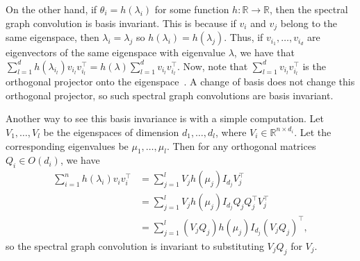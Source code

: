 \documentclass{article} \usepackage{iclr2023_conference,times}
\newcommand{\RR}{\mathbb R}
\begin{document}
On the other hand, if $\theta_i = h(\lambda_i)$ for some function $h: \RR \to \RR$, then the spectral graph convolution is basis invariant. This is because if $v_i$ and $v_j$ belong to the same eigenspace, then $\lambda_i = \lambda_j$ so $h(\lambda_i) = h(\lambda_j)$. Thus, if $v_{i_1}, \ldots, v_{i_d}$ are eigenvectors of the same eigenspace with eigenvalue $\lambda$, we have that $\sum_{l=1}^d h(\lambda_{i_l}) v_{i_l} v_{i_l}^\top = h(\lambda) \sum_{l=1}^d v_{i_l} v_{i_l}^\top$. Now, note that $\sum_{l=1}^d v_{i_l} v_{i_l}^\top$ is the orthogonal projector onto the eigenspace~\citep{trefethen1997numerical}. A change of basis does not change this orthogonal projector, so such spectral graph convolutions are basis invariant.

Another way to see this basis invariance is with a simple computation. Let $V_1, \ldots, V_l$ be the eigenspaces of dimension $d_1, \ldots, d_l$, where $V_i \in \RR^{n \times d_i}$. Let the corresponding eigenvalues be $\mu_1, \ldots, \mu_l$. Then for any orthogonal matrices $Q_i \in O(d_i)$, we have
\begin{align}
    \sum_{i=1}^n h(\lambda_i) v_i v_i^\top & = \sum_{j=1}^l V_j h(\mu_j) I_{d_j} V_j^\top\\
& = \sum_{j=1}^l V_j  h(\mu_j) I_{d_j} Q_jQ_j^\top V_j^\top\\
& = \sum_{j=1}^l (V_j Q_j) h(\mu_j) I_{d_j} (V_j Q_j)^\top,
\end{align}
so the spectral graph convolution is invariant to substituting $V_j Q_j$ for $V_j$.
\end{document}
